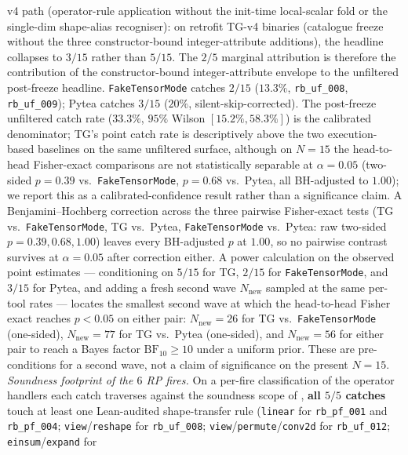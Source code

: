 v4 path (operator-rule application without the
init-time local-scalar fold or the single-dim shape-alias
recogniser): on retrofit \textsc{TG}-v4 binaries (catalogue
freeze without the three constructor-bound integer-attribute
additions), the headline
collapses to $3/15$ rather than $5/15$. The
$2/5$ marginal attribution is therefore the
contribution of the constructor-bound integer-attribute envelope
to the unfiltered post-freeze headline.
\texttt{FakeTensorMode} catches $2/15$ ($13.3\%$,
\texttt{rb\_uf\_008}, \texttt{rb\_uf\_009}); Pytea catches
$3/15$ ($20\%$, silent-skip-corrected). The post-freeze unfiltered
catch rate ($33.3\%$, $95\%$ Wilson $[15.2\%, 58.3\%]$) is the
calibrated denominator; \textsc{TG}'s
point catch rate is descriptively above the two execution-based baselines
on the same unfiltered surface, although on $N{=}15$ the head-to-head
Fisher-exact comparisons are not statistically separable at
$\alpha{=}0.05$ (two-sided $p{=}0.39$ vs.\ \texttt{FakeTensorMode},
$p{=}0.68$ vs.\ Pytea, all BH-adjusted to $1.00$); we report this as a
calibrated-confidence result rather than a significance claim.
A Benjamini--Hochberg correction across the three pairwise
Fisher-exact tests (TG vs.\ \texttt{FakeTensorMode}, TG vs.\ Pytea,
\texttt{FakeTensorMode} vs.\ Pytea: raw two-sided
$p{=}0.39, 0.68, 1.00$) leaves every BH-adjusted $p$ at $1.00$,
so no pairwise contrast survives at $\alpha{=}0.05$ after
correction either.
A power calculation on the observed point estimates --- conditioning
on $5/15$ for \textsc{TG}, $2/15$ for \texttt{FakeTensorMode}, and
$3/15$ for Pytea, and adding a fresh second wave $N_{\text{new}}$
sampled at the same per-tool rates --- locates the smallest second
wave at which the head-to-head Fisher exact reaches $p<0.05$ on
either pair: $N_{\text{new}}{=}26$ for \textsc{TG} vs.\
\texttt{FakeTensorMode} (one-sided), $N_{\text{new}}{=}77$ for
\textsc{TG} vs.\ Pytea (one-sided), and $N_{\text{new}}{=}56$ for
either pair to reach a Bayes factor $\mathrm{BF}_{10}\ge 10$ under
a uniform prior.  These are pre-conditions for a second wave, not a
claim of significance on the present $N{=}15$.
\emph{Soundness footprint of the $6$ RP fires.} On a per-fire
classification of the operator handlers each catch traverses against
the soundness scope of \Cref{tab:handler-soundness},
\textbf{all $5/5$ catches} touch at least one Lean-audited
shape-transfer rule (\texttt{linear} for \texttt{rb\_pf\_001} and
\texttt{rb\_pf\_004}; \texttt{view}/\texttt{reshape} for
\texttt{rb\_uf\_008}; \texttt{view}/\texttt{permute}/\texttt{conv2d}
for \texttt{rb\_uf\_012}; \texttt{einsum}/\texttt{expand} for
